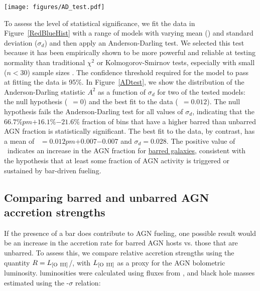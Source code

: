 \begin{figure*}
\centering
\texttt{[image: figures/AD\_test.pdf]}
\caption{Fits of the binned fraction of barred vs. unbarred AGN fractions to a normal distribution. \textit{Left:} value of the Anderson-Darling test ($A^2$) as a function of the standard deviation of the normal distribution being fit ($\sigma_d$). The horizontal black line shows the critical value of $A^2$ corresponding to 95\%; a model must fall below this line to be considered an acceptable fit at this level of confidence. Two models are shown: the null hypothesis (blue diamonds) and the best fit to the data in Figure~\ref{RedBlueHist} (purple triangles). \textit{Right}: Plot of the minimum $A^2$ for the full range of means (\db) tested for the data. This shows that acceptable fits can be found for $0.005<$\db$<0.019$, but that the null hypothesis is ruled out at 95\% confidence.}
\label{ADtest}
\end{figure*}

To assess the level of statistical significance, we fit the data in Figure~\ref{RedBlueHist} with a range of models with varying mean (\db) and standard deviation ($\sigma_d$) and then apply an Anderson-Darling test. We selected this test because it has been empirically shown to be more powerful and reliable at testing normality than traditional $\chi^2$ or Kolmogorov-Smirnov tests, especially with small ($n<30$) sample sizes \citep{Hou2009}. The confidence threshold required for the model to pass at fitting the data is 95\%. In Figure~\ref{ADtest}, we show the distribution of the Anderson-Darling statistic $A^2$ as a function of $\sigma_d$ for two  of the tested models: the null hypothesis (\db~$=0$) and the best fit to the data (\db~$=0.012$). The null hypothesis fails the Anderson-Darling test for all values of $\sigma_d$, indicating that the $66.7\%pm{+16.1\%}{-21.6\%}$ fraction of bins that have a higher barred than unbarred AGN fraction is statistically significant. The best fit to the data, by contrast, has a mean of \db~$=0.012 pm {+0.007}{-0.007}$ and $\sigma_d=0.028$. The positive value of \db~indicates an increase in the AGN fraction for \underline{barred galaxies}, consistent with the hypothesis that at least some fraction of AGN activity is triggered or sustained by bar-driven fueling.



\subsection{Comparing barred and unbarred AGN accretion strengths}
\label{sec:Eddington Ratio}
If the presence of a bar does contribute to AGN fueling, one possible result would be an increase in the accretion rate for barred AGN hosts vs. those that are unbarred. To assess this, we compare relative accretion strengths using the quantity $R=L_{\rm{[O~III]}}$/\mbh, with $L_{\rm{[O~III]}}$ as a proxy for the AGN bolometric luminosity.  luminosities were calculated using fluxes from \citet{Oh2011}, and black hole masses estimated using the \mbh-$\sigma$ relation:

